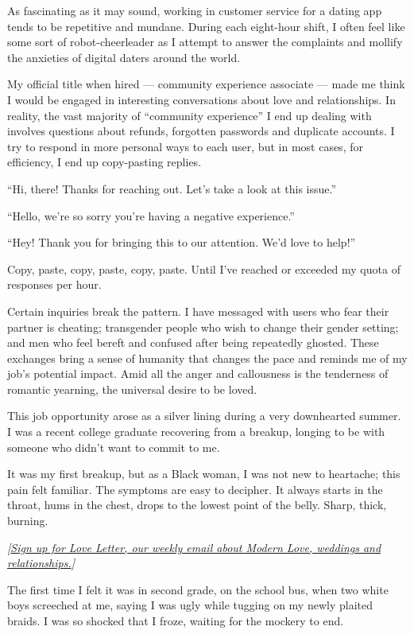 As fascinating as it may sound, working in customer service for a dating
app tends to be repetitive and mundane. During each eight-hour shift, I
often feel like some sort of robot-cheerleader as I attempt to answer
the complaints and mollify the anxieties of digital daters around the
world.

My official title when hired --- community experience associate --- made
me think I would be engaged in interesting conversations about love and
relationships. In reality, the vast majority of ``community experience''
I end up dealing with involves questions about refunds, forgotten
passwords and duplicate accounts. I try to respond in more personal ways
to each user, but in most cases, for efficiency, I end up copy-pasting
replies.

``Hi, there! Thanks for reaching out. Let's take a look at this issue.''

``Hello, we're so sorry you're having a negative experience.''

``Hey! Thank you for bringing this to our attention. We'd love to
help!''

Copy, paste, copy, paste, copy, paste. Until I've reached or exceeded my
quota of responses per hour.

Certain inquiries break the pattern. I have messaged with users who fear
their partner is cheating; transgender people who wish to change their
gender setting; and men who feel bereft and confused after being
repeatedly ghosted. These exchanges bring a sense of humanity that
changes the pace and reminds me of my job's potential impact. Amid all
the anger and callousness is the tenderness of romantic yearning, the
universal desire to be loved.

This job opportunity arose as a silver lining during a very downhearted
summer. I was a recent college graduate recovering from a breakup,
longing to be with someone who didn't want to commit to me.

It was my first breakup, but as a Black woman, I was not new to
heartache; this pain felt familiar. The symptoms are easy to decipher.
It always starts in the throat, hums in the chest, drops to the lowest
point of the belly. Sharp, thick, burning.

\emph{{[}}\href{https://www.nytimes.com/newsletters/love-letter}{\emph{Sign
up for Love Letter, our weekly email about Modern Love, weddings and
relationships.}}\emph{{]}}

The first time I felt it was in second grade, on the school bus, when
two white boys screeched at me, saying I was ugly while tugging on my
newly plaited braids. I was so shocked that I froze, waiting for the
mockery to end.


